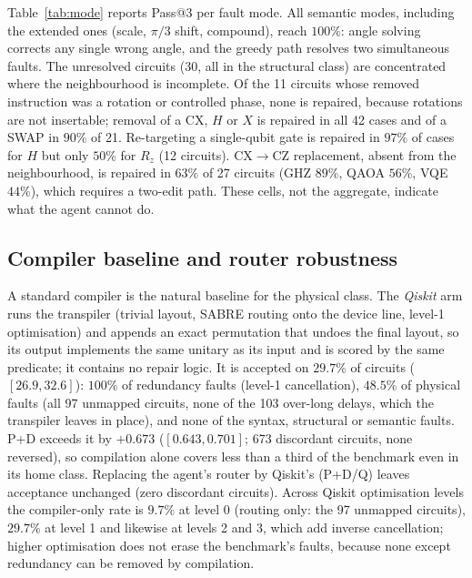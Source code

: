\documentclass[journal]{IEEEtran}
\begin{document}
Table~\ref{tab:mode} reports Pass@3 per fault mode. All semantic modes,
including the extended ones (scale, $\pi/3$ shift, compound), reach $100\%$:
angle solving corrects any single wrong angle, and the greedy path resolves two
simultaneous faults. The unresolved circuits (30, all in the structural class)
are concentrated where the neighbourhood is incomplete. Of the 11 circuits whose
removed instruction was a rotation or controlled phase, none is repaired,
because rotations are not insertable; removal of a CX, $H$ or $X$ is repaired in
all 42 cases and of a SWAP in $90\%$ of 21. Re-targeting a single-qubit gate is
repaired in $97\%$ of cases for $H$ but only $50\%$ for $R_z$ (12 circuits).
CX$\to$CZ replacement, absent from the neighbourhood, is repaired in $63\%$ of
27 circuits (GHZ $89\%$, QAOA $56\%$, VQE $44\%$), which requires a two-edit
path. These cells, not the aggregate, indicate what the agent cannot do.



\subsection{Compiler baseline and router robustness}

A standard compiler is the natural baseline for the physical class. The
\emph{Qiskit} arm runs the transpiler (trivial layout, SABRE routing onto the
device line, level-1 optimisation) and appends an exact permutation that undoes
the final layout, so its output implements the same unitary as its input and is
scored by the same predicate; it contains no repair logic. It is accepted on
$29.7\%$ of circuits ($[26.9,32.6]$): $100\%$ of redundancy faults (level-1
cancellation), $48.5\%$ of physical faults (all 97 unmapped circuits, none of the
103 over-long delays, which the transpiler leaves in place), and none of the
syntax, structural or semantic faults. P+D exceeds it by $+0.673$
($[0.643,0.701]$; 673 discordant circuits, none reversed), so compilation alone
covers less than a third of the benchmark even in its home class. Replacing the
agent's router by Qiskit's (P+D/Q) leaves acceptance unchanged (zero discordant
circuits). Across Qiskit optimisation levels the compiler-only rate is $9.7\%$
at level 0 (routing only: the 97 unmapped circuits), $29.7\%$ at level 1 and
likewise at levels 2 and 3, which add inverse cancellation; higher optimisation
does not erase the benchmark's faults, because none except redundancy can be
removed by compilation.
\end{document}

